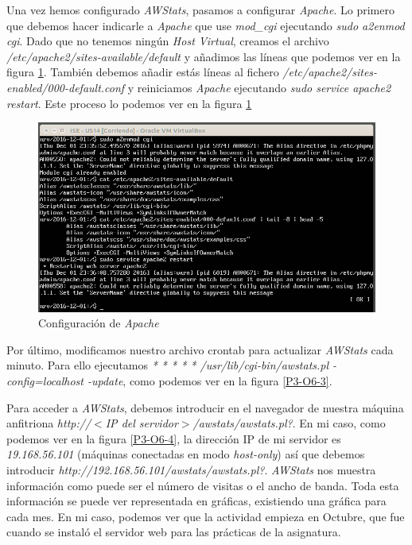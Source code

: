 \documentclass[a4paper,titlepage,12pt]{report}	%
\numberwithin{figure}{section} %
\numberwithin{table}{section} %
\begin{document}
	Una vez hemos configurado \textit{AWStats}, pasamos a configurar \textit{Apache}. Lo primero que debemos hacer indicarle a \textit{Apache} que use \textit{mod\_cgi} ejecutando \textit{sudo a2enmod cgi}. Dado que no tenemos ningún \textit{Host Virtual}, creamos el archivo \textit{/etc/apache2/sites-available/default} y añadimos las líneas que podemos ver en la figura \ref{P3-O6-2}. También debemos añadir estás líneas al fichero \textit{/etc/apache2/sites-enabled/000-default.conf} y reiniciamos \textit{Apache} ejecutando \textit{sudo service apache2 restart}. Este proceso lo podemos ver en la figura \ref{P3-O6-2}

	\begin{figure}[H]
	   \centering
	   \includegraphics[scale=0.5]{./Imagenes/P3/O6-2.png}
	   \caption[Configuración de \textit{Apache}.]{Configuración de \textit{Apache}}
	   \label{P3-O6-2}
	\end{figure}

	Por último, modificamos nuestro archivo crontab para actualizar \textit{AWStats} cada minuto. Para ello ejecutamos \textit{* * * * * /usr/lib/cgi-bin/awstats.pl -config=localhost -update}, como podemos ver en la figura \ref{P3-O6-3}.

	Para acceder a \textit{AWStats}, debemos introducir en el navegador de nuestra máquina anfitriona \textit{
	http://$<$IP del servidor$>$/awstats/awstats.pl?}. En mi caso, como podemos ver en la figura \ref{P3-O6-4}, la dirección IP de mi servidor es \textit{19.168.56.101} (máquinas conectadas en modo \textit{host-only}) así que debemos introducir \textit{http://192.168.56.101/awstats/awstats.pl?}. \textit{AWStats} nos muestra información como puede ser el número de visitas o el ancho de banda. Toda esta información se puede ver representada en gráficas, existiendo una gráfica para cada mes. En mi caso, podemos ver que la actividad empieza en Octubre, que fue cuando se instaló el servidor web para las prácticas de la asignatura.
\end{document}
